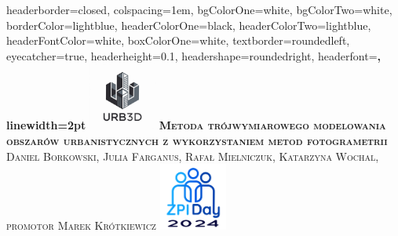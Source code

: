 \documentclass[landscape,a1paper,fontscale=0.45]{baposter} %
\begin{document}
\begin{poster}
{
headerborder=closed, %
colspacing=1em, %
bgColorOne=white, %
bgColorTwo=white, %
borderColor=lightblue, %
headerColorOne=black, %
headerColorTwo=lightblue, %
headerFontColor=white, %
boxColorOne=white, %
textborder=roundedleft, %
eyecatcher=true, %
headerheight=0.1\textheight, %
headershape=roundedright, %
headerfont=\Large\bf\textsc, %
linewidth=2pt %
}
%
{\includegraphics[height=6em]{images/logo_white.png}} %
{\bf\textsc{Metoda trójwymiarowego modelowania obszarów urbanistycznych z wykorzystaniem metod fotogrametrii}\vspace{0.5em}} %
{\textsc{Daniel Borkowski, Julia Farganus, Rafał Mielniczuk, Katarzyna Wochal, promotor Marek Krótkiewicz}}
{\includegraphics[height=6em]{images/zpi-logo.png}} %


\end{poster}
\end{document}

